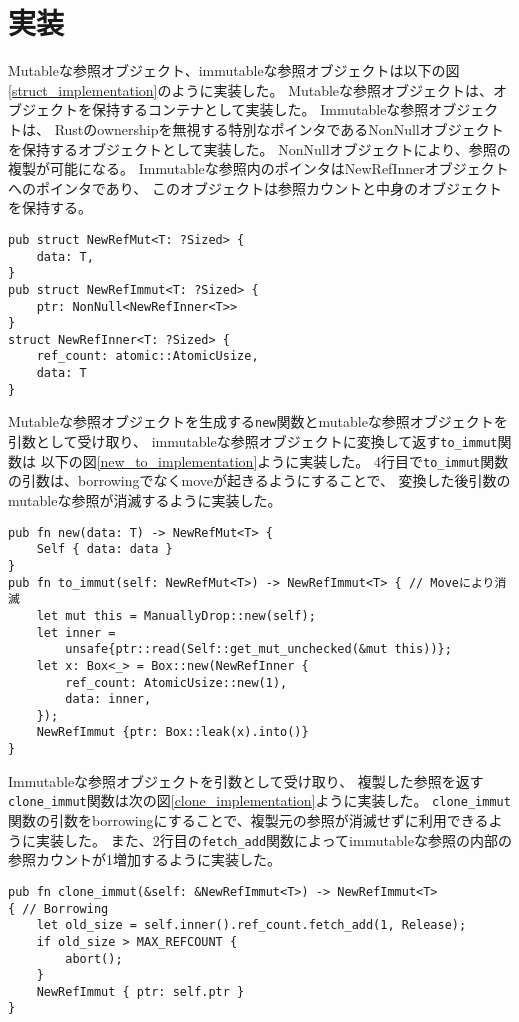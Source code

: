 \documentclass{sumiilab-paper}
\theoremstyle{mystyle}
\numberwithin{definition}{chapter} %
\begin{document}
\section{実装}
Mutableな参照オブジェクト、immutableな参照オブジェクトは以下の図\ref{struct_implementation}のように実装した。
Mutableな参照オブジェクトは、オブジェクトを保持するコンテナとして実装した。
Immutableな参照オブジェクトは、
Rustのownershipを無視する特別なポインタであるNonNullオブジェクトを保持するオブジェクトとして実装した。
NonNullオブジェクトにより、参照の複製が可能になる。
Immutableな参照内のポインタはNewRefInnerオブジェクトへのポインタであり、
このオブジェクトは参照カウントと中身のオブジェクトを保持する。
\begin{lstlisting}[caption=新たな参照オブジェクトの実装, label=struct_implementation, captionpos=b]
pub struct NewRefMut<T: ?Sized> {
    data: T,
}
pub struct NewRefImmut<T: ?Sized> {
    ptr: NonNull<NewRefInner<T>>
}
struct NewRefInner<T: ?Sized> {
    ref_count: atomic::AtomicUsize,
    data: T
}
\end{lstlisting}

Mutableな参照オブジェクトを生成する\texttt{new}関数とmutableな参照オブジェクトを引数として受け取り、
immutableな参照オブジェクトに変換して返す\texttt{to\_immut}関数は
以下の図\ref{new_to_implementation}ように実装した。
4行目で\texttt{to\_immut}関数の引数は、borrowingでなくmoveが起きるようにすることで、
変換した後引数のmutableな参照が消滅するように実装した。
\begin{lstlisting}[caption=関数newと関数to\_immutの実装, label=new_to_implementation, captionpos=b]
pub fn new(data: T) -> NewRefMut<T> {
    Self { data: data }
}
pub fn to_immut(self: NewRefMut<T>) -> NewRefImmut<T> { // Moveにより消滅
    let mut this = ManuallyDrop::new(self);
    let inner =
        unsafe{ptr::read(Self::get_mut_unchecked(&mut this))};
    let x: Box<_> = Box::new(NewRefInner {
        ref_count: AtomicUsize::new(1),
        data: inner,
    });
    NewRefImmut {ptr: Box::leak(x).into()}
}
\end{lstlisting}

Immutableな参照オブジェクトを引数として受け取り、
複製した参照を返す\texttt{clone\_immut}関数は次の図\ref{clone_implementation}ように実装した。
\texttt{clone\_immut}関数の引数をborrowingにすることで、複製元の参照が消滅せずに利用できるように実装した。
また、2行目の\texttt{fetch\_add}関数によってimmutableな参照の内部の参照カウントが1増加するように実装した。
\begin{lstlisting}[caption=関数clone\_immutの実装, label=clone_implementation, captionpos=b]
pub fn clone_immut(&self: &NewRefImmut<T>) -> NewRefImmut<T>
{ // Borrowing
    let old_size = self.inner().ref_count.fetch_add(1, Release);
    if old_size > MAX_REFCOUNT {
        abort();
    }
    NewRefImmut { ptr: self.ptr }
}
\end{lstlisting}
\end{document}
